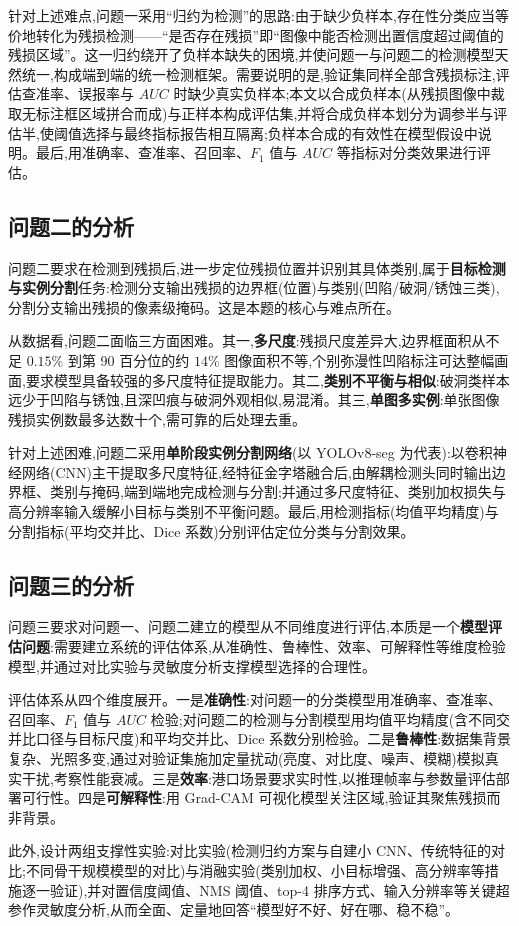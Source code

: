 针对上述难点,问题一采用“归约为检测”的思路:由于缺少负样本,存在性分类应当等价地转化为残损检测——“是否存在残损”即“图像中能否检测出置信度超过阈值的残损区域”。这一归约绕开了负样本缺失的困境,并使问题一与问题二的检测模型天然统一,构成端到端的统一检测框架。需要说明的是,验证集同样全部含残损标注,评估查准率、误报率与 $AUC$ 时缺少真实负样本;本文以合成负样本(从残损图像中裁取无标注框区域拼合而成)与正样本构成评估集,并将合成负样本划分为调参半与评估半,使阈值选择与最终指标报告相互隔离;负样本合成的有效性在模型假设中说明。最后,用准确率、查准率、召回率、$F_1$ 值与 $AUC$ 等指标对分类效果进行评估。

\subsection{问题二的分析}

问题二要求在检测到残损后,进一步定位残损位置并识别其具体类别,属于\textbf{目标检测与实例分割}任务:检测分支输出残损的边界框(位置)与类别(凹陷/破洞/锈蚀三类),分割分支输出残损的像素级掩码。这是本题的核心与难点所在。

从数据看,问题二面临三方面困难。其一,\textbf{多尺度}:残损尺度差异大,边界框面积从不足 $0.15\%$ 到第 90 百分位的约 $14\%$ 图像面积不等,个别弥漫性凹陷标注可达整幅画面,要求模型具备较强的多尺度特征提取能力。其二,\textbf{类别不平衡与相似}:破洞类样本远少于凹陷与锈蚀,且深凹痕与破洞外观相似,易混淆。其三,\textbf{单图多实例}:单张图像残损实例数最多达数十个,需可靠的后处理去重。

针对上述困难,问题二采用\textbf{单阶段实例分割网络}(以 YOLOv8-seg 为代表):以卷积神经网络(CNN)主干提取多尺度特征,经特征金字塔融合后,由解耦检测头同时输出边界框、类别与掩码,端到端地完成检测与分割;并通过多尺度特征、类别加权损失与高分辨率输入缓解小目标与类别不平衡问题。最后,用检测指标(均值平均精度)与分割指标(平均交并比、Dice 系数)分别评估定位分类与分割效果。

\subsection{问题三的分析}

问题三要求对问题一、问题二建立的模型从不同维度进行评估,本质是一个\textbf{模型评估问题}:需要建立系统的评估体系,从准确性、鲁棒性、效率、可解释性等维度检验模型,并通过对比实验与灵敏度分析支撑模型选择的合理性。

评估体系从四个维度展开。一是\textbf{准确性}:对问题一的分类模型用准确率、查准率、召回率、$F_1$ 值与 $AUC$ 检验;对问题二的检测与分割模型用均值平均精度(含不同交并比口径与目标尺度)和平均交并比、Dice 系数分别检验。二是\textbf{鲁棒性}:数据集背景复杂、光照多变,通过对验证集施加定量扰动(亮度、对比度、噪声、模糊)模拟真实干扰,考察性能衰减。三是\textbf{效率}:港口场景要求实时性,以推理帧率与参数量评估部署可行性。四是\textbf{可解释性}:用 Grad-CAM 可视化模型关注区域,验证其聚焦残损而非背景。

此外,设计两组支撑性实验:对比实验(检测归约方案与自建小 CNN、传统特征的对比;不同骨干规模模型的对比)与消融实验(类别加权、小目标增强、高分辨率等措施逐一验证),并对置信度阈值、NMS 阈值、top-4 排序方式、输入分辨率等关键超参作灵敏度分析,从而全面、定量地回答“模型好不好、好在哪、稳不稳”。
